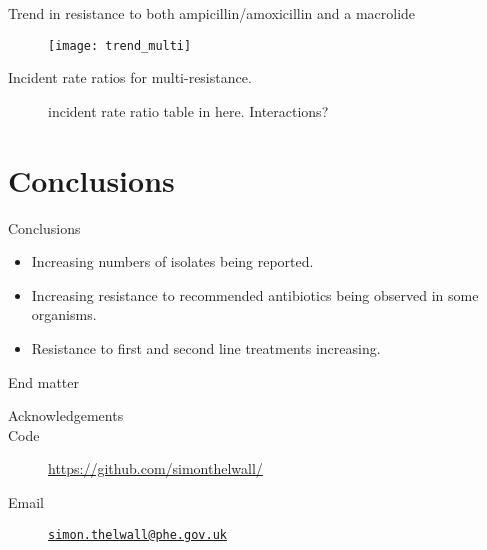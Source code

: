 \documentclass{beamer}
\begin{document}
\begin{frame}{Trend in resistance to both ampicillin/amoxicillin and a macrolide}
\begin{figure}
\texttt{[image: trend\_multi]}
\end{figure}
\end{frame}

\begin{frame}{Incident rate ratios for multi-resistance.}
\begin{figure}
incident rate ratio table in here. Interactions?
\end{figure}
\end{frame}

\section{Conclusions}
\begin{frame}{Conclusions}
\begin{itemize}
\item Increasing numbers of isolates being reported. 
\pause \item Increasing resistance to recommended antibiotics being observed in some organisms.
\pause \item Resistance to first and second line treatments increasing. 
\end{itemize}
\end{frame}

\begin{frame}{End matter}
\begin{description}
\item[Acknowledgements]\insertinstitute
\item[Code] \url{https://github.com/simonthelwall/}
\item[Email] \href{mailto:simon.thelwall@phe.gov.uk}{\nolinkurl{simon.thelwall@phe.gov.uk} }
\end{description}
\end{frame}
\end{document}
